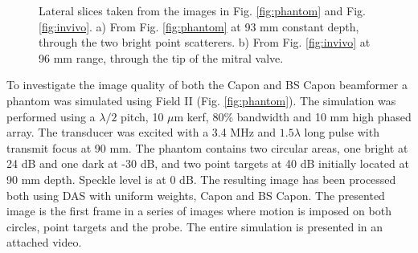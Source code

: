 \documentclass[journal]{IEEEtran}
\begin{document}
\begin{figure}[!t]
\centerline{
\hfil
{}
}
\caption{Lateral slices taken from the images in Fig. \ref{fig:phantom} and Fig. \ref{fig:invivo}. a) From Fig. \ref{fig:phantom} at 93 mm constant depth, through the two bright point scatterers. b) From Fig. \ref{fig:invivo} at 96 mm range, through the tip of the mitral valve.}
\label{fig:slices}
\end{figure}

To investigate the image quality of both the Capon and BS Capon beamformer a phantom was simulated using Field II \cite{Jensen1992} (Fig. \ref{fig:phantom}). The simulation was performed using a $\lambda/2$ pitch, 10 $\mu$m kerf, 80\% bandwidth and 10 mm high phased array. The transducer was excited with a 3.4 MHz and $1.5\lambda$ long pulse with transmit focus at 90 mm. The phantom contains two circular areas, one bright at 24 dB and one dark at -30 dB, and two point targets at 40 dB initially located at 90 mm depth. Speckle level is at 0 dB. The resulting image has been processed both using DAS with uniform weights, Capon and BS Capon. The presented image is the first frame in a series of images where motion is imposed on both circles, point targets and the probe. The entire simulation is presented in an attached video.
\end{document}
